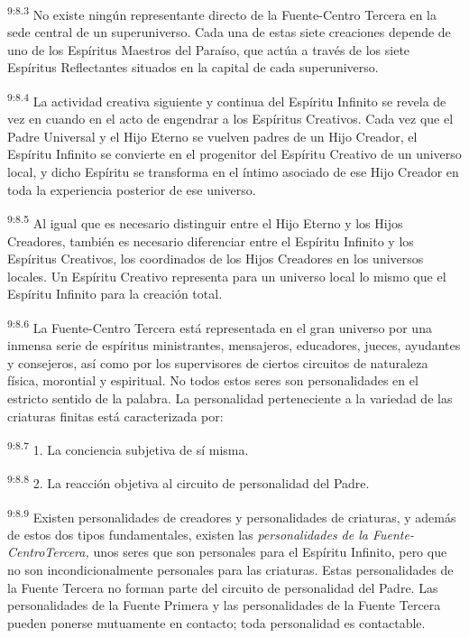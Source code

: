 \par
\textsuperscript{9:8.3} No existe ningún representante directo de la Fuente-Centro Tercera en la sede central de un superuniverso. Cada una de estas siete creaciones depende de uno de los Espíritus Maestros del Paraíso, que actúa a través de los siete Espíritus Reflectantes situados en la capital de cada superuniverso.

\par
\textsuperscript{9:8.4} La actividad creativa siguiente y continua del Espíritu Infinito se revela de vez en cuando en el acto de engendrar a los Espíritus Creativos. Cada vez que el Padre Universal y el Hijo Eterno se vuelven padres de un Hijo Creador, el Espíritu Infinito se convierte en el progenitor del Espíritu Creativo de un universo local, y dicho Espíritu se transforma en el íntimo asociado de ese Hijo Creador en toda la experiencia posterior de ese universo.

\par
\textsuperscript{9:8.5} Al igual que es necesario distinguir entre el Hijo Eterno y los Hijos Creadores, también es necesario diferenciar entre el Espíritu Infinito y los Espíritus Creativos, los coordinados de los Hijos Creadores en los universos locales. Un Espíritu Creativo representa para un universo local lo mismo que el Espíritu Infinito para la creación total.

\par
\textsuperscript{9:8.6} La Fuente-Centro Tercera está representada en el gran universo por una inmensa serie de espíritus ministrantes, mensajeros, educadores, jueces, ayudantes y consejeros, así como por los supervisores de ciertos circuitos de naturaleza física, morontial y espiritual. No todos estos seres son personalidades en el estricto sentido de la palabra. La personalidad perteneciente a la variedad de las criaturas finitas está caracterizada por:

\par
\textsuperscript{9:8.7} 1. La conciencia subjetiva de sí misma.

\par
\textsuperscript{9:8.8} 2. La reacción objetiva al circuito de personalidad del Padre.

\par
\textsuperscript{9:8.9} Existen personalidades de creadores y personalidades de criaturas, y además de estos dos tipos fundamentales, existen las \textit{personalidades de la Fuente-CentroTercera,} unos seres que son personales para el Espíritu Infinito, pero que no son incondicionalmente personales para las criaturas. Estas personalidades de la Fuente Tercera no forman parte del circuito de personalidad del Padre. Las personalidades de la Fuente Primera y las personalidades de la Fuente Tercera pueden ponerse mutuamente en contacto; toda personalidad es contactable.

